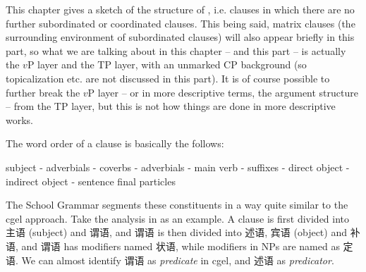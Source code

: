 \documentclass[../main.tex]{subfiles}
\begin{document}
This chapter gives a sketch of the structure of , 
i.e. clauses in which there are no further subordinated or coordinated clauses. 
This being said, matrix clauses (the surrounding environment of subordinated clauses)
will also appear briefly in this part, so what we are talking about in this chapter -- and this part -- is 
actually the $v$P layer and the TP layer, with an unmarked CP background (so topicalization etc. are not 
discussed in this part). It is of course possible 
to further break the $v$P layer -- or in more descriptive terms, the argument structure 
-- from the TP layer, but this is not how things are done in more descriptive works.

The word order of a clause is basically the follows:

subject - adverbials - coverbs - adverbials - main verb - suffixes - direct object - indirect object - sentence final particles

The School Grammar segments these constituents in a way quite similar to the \ac{cgel} approach. 
Take the analysis in \citet[chap. 5]{xianhan2004} as an example.
A clause is first divided into 主语 (subject) and 谓语, and 谓语 is then divided into 述语, 宾语 (object) and 补语,
and 谓语 has modifiers named 状语, while modifiers in NPs are named as 定语. We can almost identify 
谓语 as \emph{predicate} in \ac{cgel}, and 述语 as \emph{predicator}. 
\end{document}
